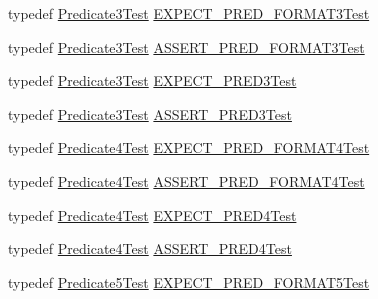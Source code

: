 \begin{DoxyCompactItemize}
typedef \mbox{\hyperlink{class_predicate3_test}{Predicate3\+Test}} \mbox{\hyperlink{googletest-master_2googletest_2test_2gtest__pred__impl__unittest_8cc_a338bfbaa3935e8ed55c11195e5b53c20}{E\+X\+P\+E\+C\+T\+\_\+\+P\+R\+E\+D\+\_\+\+F\+O\+R\+M\+A\+T3\+Test}}
\item 
typedef \mbox{\hyperlink{class_predicate3_test}{Predicate3\+Test}} \mbox{\hyperlink{googletest-master_2googletest_2test_2gtest__pred__impl__unittest_8cc_ac2bfdb213c3119d730d1aa3fcc4daa56}{A\+S\+S\+E\+R\+T\+\_\+\+P\+R\+E\+D\+\_\+\+F\+O\+R\+M\+A\+T3\+Test}}
\item 
typedef \mbox{\hyperlink{class_predicate3_test}{Predicate3\+Test}} \mbox{\hyperlink{googletest-master_2googletest_2test_2gtest__pred__impl__unittest_8cc_a15eb53ab3f302d7bfffe1352f3902eb4}{E\+X\+P\+E\+C\+T\+\_\+\+P\+R\+E\+D3\+Test}}
\item 
typedef \mbox{\hyperlink{class_predicate3_test}{Predicate3\+Test}} \mbox{\hyperlink{googletest-master_2googletest_2test_2gtest__pred__impl__unittest_8cc_a631dbdd4bb24b4cf62268ea432a2719e}{A\+S\+S\+E\+R\+T\+\_\+\+P\+R\+E\+D3\+Test}}
\item 
typedef \mbox{\hyperlink{class_predicate4_test}{Predicate4\+Test}} \mbox{\hyperlink{googletest-master_2googletest_2test_2gtest__pred__impl__unittest_8cc_a259c13bd25f54a4f79b72de17fd86caa}{E\+X\+P\+E\+C\+T\+\_\+\+P\+R\+E\+D\+\_\+\+F\+O\+R\+M\+A\+T4\+Test}}
\item 
typedef \mbox{\hyperlink{class_predicate4_test}{Predicate4\+Test}} \mbox{\hyperlink{googletest-master_2googletest_2test_2gtest__pred__impl__unittest_8cc_abea1e8f7f9efe2e944f9e90056d2d805}{A\+S\+S\+E\+R\+T\+\_\+\+P\+R\+E\+D\+\_\+\+F\+O\+R\+M\+A\+T4\+Test}}
\item 
typedef \mbox{\hyperlink{class_predicate4_test}{Predicate4\+Test}} \mbox{\hyperlink{googletest-master_2googletest_2test_2gtest__pred__impl__unittest_8cc_abbf7ac63ea663c0dec815df5770cd2a8}{E\+X\+P\+E\+C\+T\+\_\+\+P\+R\+E\+D4\+Test}}
\item 
typedef \mbox{\hyperlink{class_predicate4_test}{Predicate4\+Test}} \mbox{\hyperlink{googletest-master_2googletest_2test_2gtest__pred__impl__unittest_8cc_a0467f5052687e11dccf9f45db63e9941}{A\+S\+S\+E\+R\+T\+\_\+\+P\+R\+E\+D4\+Test}}
\item 
typedef \mbox{\hyperlink{class_predicate5_test}{Predicate5\+Test}} \mbox{\hyperlink{googletest-master_2googletest_2test_2gtest__pred__impl__unittest_8cc_aedface39db3a4a232e856e9e5b0d93b4}{E\+X\+P\+E\+C\+T\+\_\+\+P\+R\+E\+D\+\_\+\+F\+O\+R\+M\+A\+T5\+Test}}
\item 

\end{DoxyCompactItemize}
